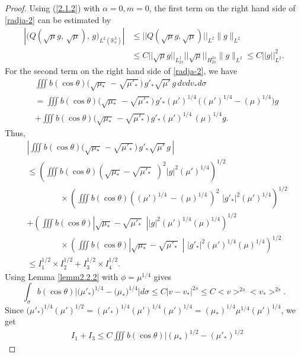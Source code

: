 \documentclass{amsart}[12pt, article]
\begin{document}
\begin{proof}
Using (\ref{2.1.2}) with $\alpha=0, m=0$, the first term on the right hand side of \eqref{radja-2} can be estimated by
\begin{align*}
\left|(Q (\sqrt{\mu} g,\, \sqrt{\mu} ),\,
g\Big)_{L^2({{{\mathbb R}}}^3_v)}\right|&\leq || Q (\sqrt{\mu} g, \sqrt{\mu}
)||_{L^2}\|g\|_{L^2}\\
&\leq C || \sqrt{\mu} g||_{L^1_{2s}} || \sqrt{\mu}
||_{H^{2s}_{2s}}\|g\|_{L^2} \leq C || g ||^2_{L^2}.
\end{align*}
For the second term on the right hand side of \eqref{radja-2}, we have
\begin{align*}
&\iiint b(\cos\theta)\Big(\sqrt{\mu_\ast}\, - \sqrt{\mu'_\ast}\,
\Big)\, g'_\ast \sqrt{\mu'}\, g\,dv dv_* d\sigma\\
&= \iiint b(\cos\theta)\Big(\sqrt{\mu_\ast}\, - \sqrt{\mu'_\ast}\,
\Big)\, g'_\ast (\mu')^{1/4}\,\Big((\mu')^{1/4}-(\mu)^{1/4}\Big)
g\,\\
&+\iiint b(\cos\theta)\Big(\sqrt{\mu_\ast}\, - \sqrt{\mu'_\ast}\,
\Big)\, g'_\ast (\mu')^{1/4}\,(\mu)^{1/4} g.
\end{align*}
Thus,
\begin{align*}
&\left| \iiint b(\cos\theta)\Big(\sqrt{\mu_\ast}\, -
\sqrt{\mu'_\ast}\, \Big)\, g'_\ast \sqrt{\mu'}\, g\,\right| \\
&\leq \left( \iiint b(\cos\theta) \left( \sqrt{\mu_*} -
\sqrt{\mu'_*}\,\, \, \right)^2 |g |^2 (\mu')^{1/4}
\right)^{1/2}\\
&\qquad\qquad\times\left( \iiint b(\cos\theta) \left((\mu')^{1/4}\,
- (\mu)^{1/4}\, \right)^2\,\, |g'_*|^2 (\mu')^{1/4} \right)^{1/2}
\\
&+ \left(\iiint b(\cos\theta) \left| \sqrt{\mu_*} -
\sqrt{\mu'_*}\,\, \, \right| |g |^2 (\mu')^{1/4}(\mu)^{1/4}
\right)^{1/2}\\
&\qquad\qquad\times\left( \iiint b(\cos\theta) \left| \sqrt{\mu_*} -
\sqrt{\mu'_*}\,\, \, \right|\,\, |g'_*|^2 (\mu')^{1/4}(\mu)^{1/4}
\right)^{1/2}\\
&\leq I_1^{1/2}\times I_2^{1/2}+I_3^{1/2}\times I_4^{1/2} .
\end{align*}
Using Lemma \ref{lemm2.2.2} with $\phi=\mu^{1/4}$ gives
$$\int_\sigma b(\cos\theta) \Big| \big(\mu'_\ast\big)^{1/4}
- \big(\mu_\ast\big)^{1/4} \Big| d\sigma
\leq C | v-v_\ast |^{2s} \leq C < v>^{2s} < v_\ast >^{2s}.
$$
Since $\big(\mu'_\ast\big)^{1/4} (\mu')^{1/2} = (\mu'_*)^{1/4}
(\mu')^{1/4} (\mu')^{1/4} = (\mu_*)^{1/4} \mu^{1/4} (\mu')^{1/4}$,
we get
\begin{align*}
&I_1+I_3\leq C \iiint b(\cos\theta) | (\mu_*)^{1/2} - (\mu'_*)^{1/2}

\end{align*}
\end{proof}
\end{document}
